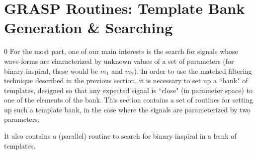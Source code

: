 \section{GRASP Routines: Template Bank Generation \& Searching}
\label{s:template}
\setcounter{equation}0
For the most part, one of our main interests is the search
for signals whose wave-forms are characterized
by unknown values of a set of parameters (for binary inspiral, these
would be $m_1$ and $m_2$).
In order to use the matched filtering technique described in the previous section,
it is necessary to set up a ``bank" of templates, designed so that any
expected signal is ``close" (in parameter space) to one of
the elements of the bank.
This section contains a set of routines for setting up such a template bank,
in the case where the signals are parameterized by two parameters.

It also contains a (parallel) routine to search for binary inspiral
in a bank of templates.
